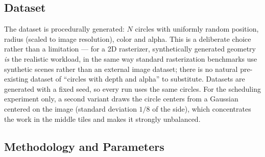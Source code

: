 \documentclass[10pt,twocolumn,letterpaper]{article}
\begin{document}
\subsection{Dataset}

The dataset is procedurally generated: $N$ circles with uniformly random
position, radius (scaled to image resolution), color and alpha. This is a
deliberate choice rather than a limitation — for a 2D rasterizer,
synthetically generated geometry \emph{is} the realistic workload, in the
same way standard rasterization benchmarks use synthetic scenes rather than
an external image dataset; there is no natural pre-existing dataset of
``circles with depth and alpha'' to substitute. Datasets are generated with
a fixed seed, so every run uses the same circles. For the scheduling
experiment only, a second variant draws the circle centers from a Gaussian
centered on the image (standard deviation $1/8$ of the side), which
concentrates the work in the middle tiles and makes it strongly unbalanced.

\subsection{Methodology and Parameters}
\end{document}
